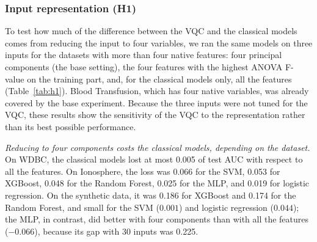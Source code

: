 \subsubsection{Input representation (H1)}

To test how much of the difference between the VQC and the classical models comes from reducing the input to four variables, we ran the same models on three inputs for the datasets with more than four native features: four principal components (the base setting), the four features with the highest ANOVA F-value on the training part, and, for the classical models only, all the features (Table~\ref{tab:h1}). Blood Transfusion, which has four native variables, was already covered by the base experiment. Because the three inputs were not tuned for the VQC, these results show the sensitivity of the VQC to the representation rather than its best possible performance.

\textit{Reducing to four components costs the classical models, depending on the dataset.} On WDBC, the classical models lost at most 0.005 of test AUC with respect to all the features. On Ionosphere, the loss was 0.066 for the SVM, 0.053 for XGBoost, 0.048 for the Random Forest, 0.025 for the MLP, and 0.019 for logistic regression. On the synthetic data, it was 0.186 for XGBoost and 0.174 for the Random Forest, and small for the SVM ($0.001$) and logistic regression ($0.044$); the MLP, in contrast, did better with four components than with all the features ($-0.066$), because its gap with 30 inputs was 0.225.

